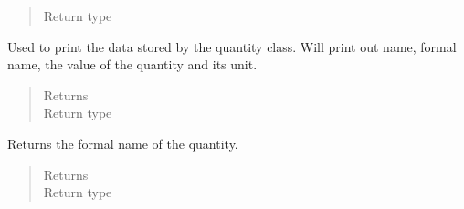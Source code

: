 \documentclass[letterpaper,10pt,openany,oneside,english]{sphinxmanual}
\begin{document}
\begin{fulllineitems}
\begin{fulllineitems}
\begin{quote}
\begin{description}
\item[{Return type}] \leavevmode
{}

\end{description}\end{quote}

\end{fulllineitems}


\begin{fulllineitems}
\label{\detokenize{support_rst/quantity:quantity.Quantity.__str__}}
Used to print the data stored by the quantity class. Will print out
name, formal name, the value of the quantity and its unit.
\begin{quote}\begin{description}
\item[{Returns}] \leavevmode
{}

\item[{Return type}] \leavevmode
{}

\end{description}\end{quote}

\end{fulllineitems}


\begin{fulllineitems}
\label{\detokenize{support_rst/quantity:quantity.Quantity.formalName}}
Returns the formal name of the quantity.
\begin{quote}\begin{description}
\item[{Returns}] \leavevmode
{}

\item[{Return type}] \leavevmode
{}

\end{description}\end{quote}

\end{fulllineitems}



\end{fulllineitems}
\end{document}
